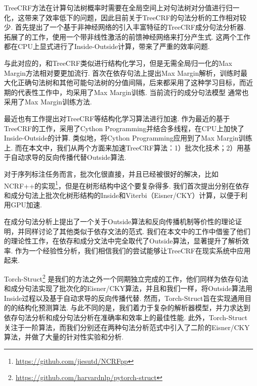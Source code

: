 TreeCRF方法在计算句法树概率时需要在全局空间上对句法树对分值进行归一化，这带来了效率低下的问题，因此目前关于TreeCRF的句法分析的工作相对较少.
\citet{finkel-etal-2008-efficient}首先提出了一个基于非神经网络的引入丰富特征的TreeCRF成分句法分析器.
\citet{durrett-klein-2015-neural}拓展了\citet{finkel-etal-2008-efficient}的工作，使用一个带非线性激活的前馈神经网络来打分产生式.
这两个工作都在CPU上显式进行了Inside-Outside计算，带来了严重的效率问题.

与此对应的，和TreeCRF类似进行结构化学习，但是无需全局归一化的Max Margin方法相对要更加流行.
\citet{taskar-etal-2004-max}首次在依存句法上提出Max Margin解析，训练时最大化正确句法树和其他可能句法树的分值间隔，后来\citet{mcdonald-etal-2005-online,mcdonald-etal-2005-online}都采用了这种学习目标，而近期的代表性工作中，\citet{wang-chang-2016-graph,kiperwasser-goldberg-2016-simple}均采用了Max Margin训练.
当前流行的成分句法模型 \citep{stern-etal-2017-minimal,kitaev-klein-2018-constituency,zhou-zhao-2019-head}通常也采用了Max Margin训练方法.

最近也有工作提出对TreeCRF等结构化学习算法进行加速.
\citet{zhang-etal-2017-dependency-parsing,jiang-etal-2018-supervised,li-etal-2019-semi-supervised}作为最近的基于TreeCRF的工作，采用了Cython Programming并结合多线程，在CPU上加快了Inside-Outside的计算.
类似地，\citet{kitaev-klein-2018-constituency}将Cython Programming应用到了Max Margin训练上.
而在本文中，我们从两个方面来加速TreeCRF算法：1）批次化技术；2）用基于自动求导的反向传播代替Outside算法.

对于序列标注任务而言，批次化很直接，并且已经被很好的解决，比如NCRF++的实现\footnote{\url{https://github.com/jiesutd/NCRFpp}}，但是在树形结构中这个要复杂得多.
我们首次提出分别在依存和成分句法上批次化树形结构的Inside和Viterbi（Eisner/CKY）计算，以便于利用GPU加速.

\citet{eisner-2016-inside}在成分句法分析上提出了一个关于Outside算法和反向传播机制等价性的理论证明，并同样讨论了其他类似于依存文法的范式.
我们在本文中的工作中借鉴了他们的理论性工作，在依存和成分文法中完全取代了Outside算法，显著提升了解析效率.
作为一个经验性分析，我们相信我们的尝试能够让TreeCRF在现实系统中应用起来.

Torch-Struct\footnote{\url{https://github.com/harvardnlp/pytorch-struct}} \citep{rush-2020-torch}是我们的方法之外一个同期独立完成的工作，他们同样为依存句法和成分句法实现了批次化的Eisner/CKY算法，并且和我们一样，将Outside算法用Inside过程以及基于自动求导的反向传播代替.
然而，Torch-Struct旨在实现通用目的的结构化预测算法.
与此不同的是，我们着力于复杂的解析器模型，并力求达到依存句法分析和成分句法分析在准确率和效率上的最佳性能.
此外，Torch-Struct关注于一阶算法，而我们分别还在两种句法分析范式中引入了二阶的Eisner/CKY算法，并做了大量的针对性实验和分析.

